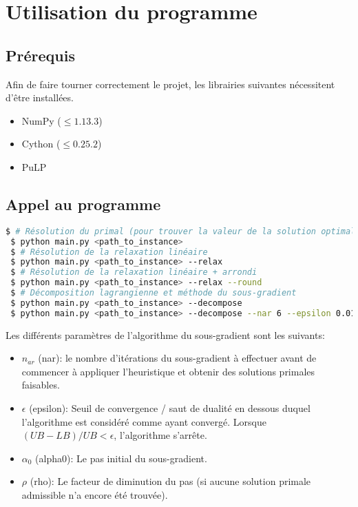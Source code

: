 \chapter{Utilisation du programme}
\vspace*{1.2cm}
 
 
\section{Prérequis}
 
Afin de faire tourner correctement le projet, les librairies suivantes nécessitent d'être installées.
\begin{itemize}
 \item NumPy ($\le 1.13.3$)
 \item Cython ($ \le 0.25.2$)
 \item PuLP
\end{itemize}
 
\section{Appel au programme}
 
\begin{lstlisting}[language=bash]
 $ # Résolution du primal (pour trouver la valeur de la solution optimale)
 $ python main.py <path_to_instance>
 $ # Résolution de la relaxation linéaire
 $ python main.py <path_to_instance> --relax
 $ # Résolution de la relaxation linéaire + arrondi
 $ python main.py <path_to_instance> --relax --round
 $ # Décomposition lagrangienne et méthode du sous-gradient
 $ python main.py <path_to_instance> --decompose
 $ python main.py <path_to_instance> --decompose --nar 6 --epsilon 0.01 --alpha0 2000 --rho 0.96
\end{lstlisting}
 
Les différents paramètres de l'algorithme du sous-gradient sont les suivants:
\begin{itemize}
    \item $n_{ar}$ (nar): le nombre d'itérations du sous-gradient à effectuer avant de commencer à appliquer
   l'heuristique et obtenir des solutions primales faisables.
    \item $\epsilon$ (epsilon): Seuil de convergence / saut de dualité en dessous duquel l'algorithme est considéré comme
   ayant convergé. Lorsque $(UB - LB) / UB  < \epsilon$, l'algorithme s'arrête.
   \item $\alpha_0$ (alpha0): Le pas initial du sous-gradient.
   \item $\rho$ (rho): Le facteur de diminution du pas (si aucune solution primale admissible n'a encore été trouvée).
\end{itemize}